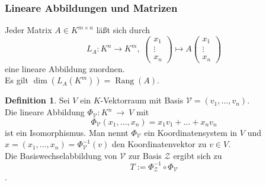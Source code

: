 \documentclass[fontsize=12pt,paper=a4,twoside,bibtotoc,idxtotoc,
liststotoc,pagesize,BCOR1.2cm,DIV15,chapterprefix,pagesize=pdftex]{scrbook}
\theoremstyle{plain}
\theoremstyle{definition}
\newtheorem{df}[equation]{Definition}
\theoremstyle{remark}
\begin{document}
\subsubsection{Lineare Abbildungen und Matrizen}
Jeder Matrix $A \in K^{m \times n}$ läßt sich durch 
\[
 L_A: K^n \rightarrow K^m,\; 
\begin{pmatrix}
 x_1\\
\vdots\\
x_n
\end{pmatrix}
\longmapsto
A
\begin{pmatrix}
 x_1\\
\vdots\\
x_n
\end{pmatrix}
\]
eine lineare Abbildung zuordnen.\\
Es gilt $\operatorname{dim}(L_A(K^m))=\operatorname{Rang}(A)$.
\begin{df}
Sei $V$ ein $K$-Vektorraum mit Basis $\mathcal{V}=(v_1, \dots
,v_n)$.\\
Die lineare Abbildung $\Phi_\mathcal{V}:K^n \ \rightarrow \ V$ mit
\[\Phi_\mathcal{V}(x_1,\dots ,x_n)=x_1v_1+ \dots +x_nv_n\]
ist ein Isomorphismus. Man nennt $\Phi_\mathcal{V}$ ein
Koordinatensystem in $V$ und $x=(x_1,\dots ,x_n)=\Phi_\mathcal{V}^{-1}(v)$
den Koordinatenvektor zu $v \in V$.\\
Die Basiswechselabbildung von $\mathcal{V}$ zur Basis $\mathcal{Z}$ ergibt sich zu
\[T:= \Phi_\mathcal{Z}^{-1} \circ \Phi_\mathcal{V}\].
\end{df}
\end{document}

